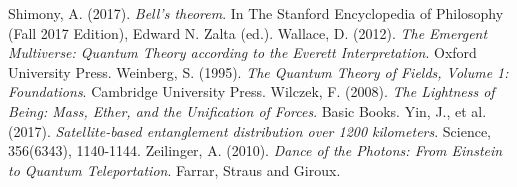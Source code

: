 \documentclass[12pt,a4paper]{article}
\begin{document}
\begin{thebibliography}{99}
		 Shimony, A. (2017). \textit{Bell's theorem}. In The Stanford Encyclopedia of Philosophy (Fall 2017 Edition), Edward N. Zalta (ed.).
		 Wallace, D. (2012). \textit{The Emergent Multiverse: Quantum Theory according to the Everett Interpretation}. Oxford University Press.
		 Weinberg, S. (1995). \textit{The Quantum Theory of Fields, Volume 1: Foundations}. Cambridge University Press.
		 Wilczek, F. (2008). \textit{The Lightness of Being: Mass, Ether, and the Unification of Forces}. Basic Books.
		 Yin, J., et al. (2017). \textit{Satellite-based entanglement distribution over 1200 kilometers}. Science, 356(6343), 1140-1144.
		 Zeilinger, A. (2010). \textit{Dance of the Photons: From Einstein to Quantum Teleportation}. Farrar, Straus and Giroux.
	\end{thebibliography}
	
\end{document}
